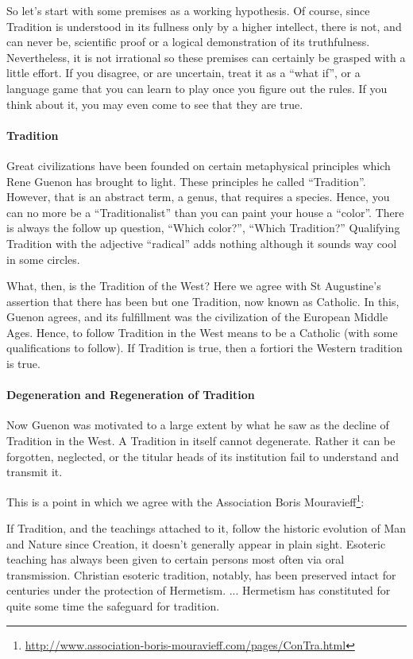 So let's start with some premises as a working hypothesis. Of course, since Tradition is understood in its fullness only by a higher intellect, there is not, and can never be, scientific proof or a logical demonstration of its truthfulness. Nevertheless, it is not irrational so these premises can certainly be grasped with a little effort. If you disagree, or are uncertain, treat it as a ``what if'', or a language game that you can learn to play once you figure out the rules. If you think about it, you may even come to see that they are true.

\paragraph{Tradition}


Great civilizations have been founded on certain metaphysical principles which Rene Guenon has brought to light. These principles he called ``Tradition''. However, that is an abstract term, a genus, that requires a species. Hence, you can no more be a ``Traditionalist'' than you can paint your house a ``color''. There is always the follow up question, ``Which color?'', ``Which Tradition?'' Qualifying Tradition with the adjective ``radical'' adds nothing although it sounds way cool in some circles.

What, then, is the Tradition of the West? Here we agree with St Augustine's assertion that there has been but one Tradition, now known as Catholic. In this, Guenon agrees, and its fulfillment was the civilization of the European Middle Ages. Hence, to follow Tradition in the West means to be a Catholic (with some qualifications to follow). If Tradition is true, then a fortiori the Western tradition is true.

\paragraph{Degeneration and Regeneration of Tradition}


Now Guenon was motivated to a large extent by what he saw as the decline of Tradition in the West. A Tradition in itself cannot degenerate. Rather it can be forgotten, neglected, or the titular heads of its institution fail to understand and transmit it.

This is a point in which we agree with the Association Boris Mouravieff\footnote{\url{http://www.association-boris-mouravieff.com/pages/ConTra.html}}:

\begin{quotex}
If Tradition, and the teachings attached to it, follow the historic evolution of Man and Nature since Creation, it doesn't generally appear in plain sight. Esoteric teaching has always been given to certain persons most often via oral transmission. Christian esoteric tradition, notably, has been preserved intact for centuries under the protection of Hermetism. ... Hermetism has constituted for quite some time the safeguard for tradition.
\end{quotex}


